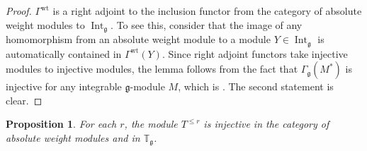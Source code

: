 \documentclass{amsart}
\newcommand{\Tg}{\mathbb T_{\mathfrak g}}
\renewcommand{\gg}{\mathfrak{g}}
\newtheorem{prop}[thm]{Proposition}
\theoremstyle{definition}
\numberwithin{equation}{section}
\begin{document}
\begin{proof}
$\Gamma^\mathrm{wt}$ is a right adjoint to the inclusion functor from the category of absolute weight modules to $\operatorname{Int}_\gg$.  To see this, consider that the image of any homomorphism from an absolute weight module to a module $Y \in \operatorname{Int}_\gg$ is automatically contained in $\Gamma^\mathrm{wt} (Y)$.
Since right adjoint functors take injective modules to injective modules, the lemma follows from the fact that $\Gamma_\gg (M^*)$ is injective for any integrable $\gg$-module $M$, which is \cite[Proposition 3.2]{PS}.  The second statement is clear.
\end{proof}


\begin{prop}
For each $r$, the module $T^{\leq r}$ is injective in the category of absolute weight modules and in $\Tg$.
\end{prop}
\end{document}

